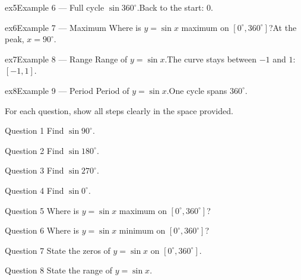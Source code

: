 \documentclass[11pt]{article}
\begin{document}
\begin{example}{ex5}{Example 6 --- Full cycle}
$\sin360^\circ$.\soln Back to the start: $0$.
\end{example}

\begin{example}{ex6}{Example 7 --- Maximum}
Where is $y=\sin x$ maximum on $[0^\circ,360^\circ]$?\soln At the peak, $x=90^\circ$.
\end{example}

\begin{example}{ex7}{Example 8 --- Range}
Range of $y=\sin x$.\soln The curve stays between $-1$ and $1$: $[-1,1]$.
\end{example}

\begin{example}{ex8}{Example 9 --- Period}
Period of $y=\sin x$.\soln One cycle spans $360^\circ$.
\end{example}

\clearpage
{}
For each question, show all steps clearly in the space provided.

\begin{qbox}{Question 1}
Find $\sin90^\circ$.\workspace{2.4cm}
\end{qbox}

\begin{qbox}{Question 2}
Find $\sin180^\circ$.\workspace{2.4cm}
\end{qbox}

\begin{qbox}{Question 3}
Find $\sin270^\circ$.\workspace{2.4cm}
\end{qbox}

\begin{qbox}{Question 4}
Find $\sin0^\circ$.\workspace{2.4cm}
\end{qbox}

\begin{qbox}{Question 5}
Where is $y=\sin x$ maximum on $[0^\circ,360^\circ]$?\workspace{2.4cm}
\end{qbox}

\begin{qbox}{Question 6}
Where is $y=\sin x$ minimum on $[0^\circ,360^\circ]$?\workspace{2.4cm}
\end{qbox}

\begin{qbox}{Question 7}
State the zeros of $y=\sin x$ on $[0^\circ,360^\circ]$.\workspace{2.4cm}
\end{qbox}

\begin{qbox}{Question 8}
State the range of $y=\sin x$.\workspace{2.4cm}
\end{qbox}
\end{document}
